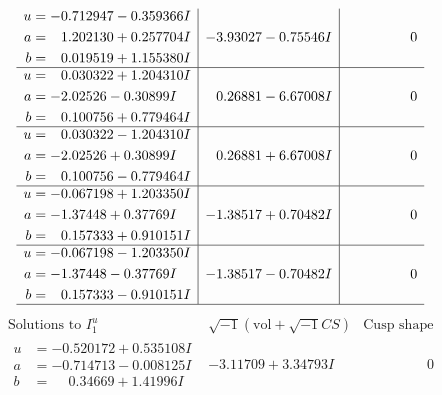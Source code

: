 \documentclass[1p]{elsarticle_modified}
\theoremstyle{definition}
\newcommand{\I}{\sqrt{-1}}
\begin{document}
$$\begin{array}{c|c|c}
\begin{aligned}
u &= -0.712947 - 0.359366 I \\
a &= \phantom{-}1.202130 + 0.257704 I \\
b &= \phantom{-}0.019519 + 1.155380 I\end{aligned}
 & -3.93027 - 0.75546 I & \phantom{-0.000000 } 0 \\ \hline\begin{aligned}
u &= \phantom{-}0.030322 + 1.204310 I \\
a &= -2.02526 - 0.30899 I \\
b &= \phantom{-}0.100756 + 0.779464 I\end{aligned}
 & \phantom{-}0.26881 - 6.67008 I & \phantom{-0.000000 } 0 \\ \hline\begin{aligned}
u &= \phantom{-}0.030322 - 1.204310 I \\
a &= -2.02526 + 0.30899 I \\
b &= \phantom{-}0.100756 - 0.779464 I\end{aligned}
 & \phantom{-}0.26881 + 6.67008 I & \phantom{-0.000000 } 0 \\ \hline\begin{aligned}
u &= -0.067198 + 1.203350 I \\
a &= -1.37448 + 0.37769 I \\
b &= \phantom{-}0.157333 + 0.910151 I\end{aligned}
 & -1.38517 + 0.70482 I & \phantom{-0.000000 } 0 \\ \hline\begin{aligned}
u &= -0.067198 - 1.203350 I \\
a &= -1.37448 - 0.37769 I \\
b &= \phantom{-}0.157333 - 0.910151 I\end{aligned}
 & -1.38517 - 0.70482 I & \phantom{-0.000000 } 0\\
 \hline 
 \end{array}$$\newpage$$\begin{array}{c|c|c}  
\text{Solutions to }I^u_{1}& \I (\text{vol} + \sqrt{-1}CS) & \text{Cusp shape}\\
 \hline 
\begin{aligned}
u &= -0.520172 + 0.535108 I \\
a &= -0.714713 - 0.008125 I \\
b &= \phantom{-}0.34669 + 1.41996 I\end{aligned}
 & -3.11709 + 3.34793 I & \phantom{-0.000000 } 0 \\ \hline\begin{aligned}

\end{aligned}
\end{array}$$
\end{document}
